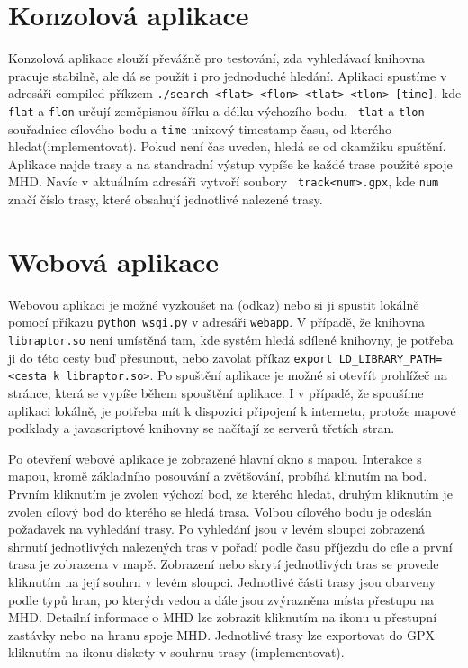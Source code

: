\section{Konzolová aplikace}
Konzolová aplikace slouží převážně pro testování, zda vyhledávací knihovna
pracuje stabilně, ale dá se použít i pro jednoduché hledání. Aplikaci spustíme
v adresáři compiled příkzem {\tt ./search <flat> <flon> <tlat> <tlon> [time]},
kde {\tt flat} a {\tt flon} určují zeměpisnou šířku a délku výchozího bodu, {\tt
tlat} a {\tt tlon} souřadnice cílového bodu a {\tt time} unixový timestamp času,
od kterého hledat(\TODO implementovat). Pokud není čas uveden, hledá se od
okamžiku spuštění.  Aplikace najde trasy a na standradní výstup vypíše ke každé
trase použité spoje MHD. Navíc v aktuálním adresáři vytvoří soubory {\tt
track<num>.gpx}, kde {\tt num} značí číslo trasy, které obsahují jednotlivé
nalezené trasy.
 
\section{Webová aplikace}
Webovou aplikaci je možné vyzkoušet na (\TODO odkaz) nebo si ji spustit lokálně
pomocí příkazu {\tt python wsgi.py} v adresáři {\tt webapp}. V případě, že knihovna
{\tt libraptor.so} není umístěná tam, kde systém hledá sdílené knihovny, je potřeba ji
do této cesty buď přesunout, nebo zavolat příkaz {\tt export
LD\_LIBRARY\_PATH=<cesta k libraptor.so>}. Po spuštění aplikace je možné si
otevřít prohlížeč na stránce, která se vypíše během spouštění aplikace. I v
případě, že spoušíme aplikaci lokálně, je potřeba mít k dispozici připojení k
internetu, protože mapové podklady a javascriptové knihovny se načítají ze
serverů třetích stran.

Po otevření webové aplikace je zobrazené hlavní okno s mapou. Interakce s mapou,
kromě základního posouvání a zvětšování, probíhá klinutím na bod. Prvním
kliknutím je zvolen výchozí bod, ze kterého hledat, druhým kliknutím je zvolen
cílový bod do kterého se hledá trasa. Volbou cílového bodu je odeslán požadavek
na vyhledání trasy. Po vyhledání jsou v levém sloupci zobrazená shrnutí
jednotlivých nalezených tras v pořadí podle času příjezdu do cíle a první trasa
je zobrazena v mapě. Zobrazení nebo skrytí jednotlivých tras se provede
kliknutím na její souhrn v levém sloupci. Jednotlivé části trasy jsou obarveny
podle typů hran, po kterých vedou a dále jsou zvýrazněna místa přestupu na MHD.
Detailní informace o MHD lze zobrazit kliknutím na ikonu u přestupní zastávky
nebo na hranu spoje MHD. Jednotlivé trasy lze exportovat do GPX kliknutím na
ikonu diskety v souhrnu trasy (\TODO implementovat). 
